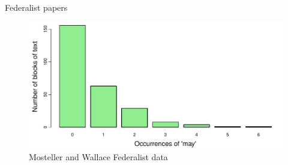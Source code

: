 \documentclass[11pt]{book}\usepackage[]{graphicx}\usepackage[]{color}
\newenvironment{knitrout}{}{} %
\renewenvironment{knitrout}{\small\renewcommand{\baselinestretch}{.85}}{} %
\begin{document}
\begin{Example}[madison1]{Federalist papers}
\begin{knitrout}
\begin{figure}[htbp]
\centerline{\includegraphics[width=.75\textwidth]{ch03/fig/federalist} }

\caption[Mosteller and Wallace Federalist data]{Mosteller and Wallace Federalist data\label{fig:federalist}}
\end{figure}


\end{knitrout}

\end{Example}
\end{document}
